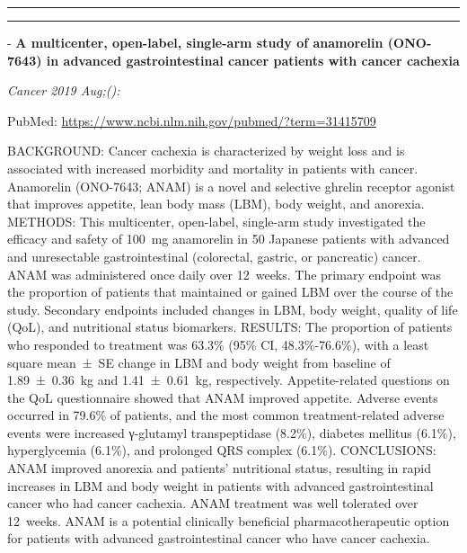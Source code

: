 \documentclass[]{article}
\begin{document}
{}

{}

\begin{center}\rule{0.5\linewidth}{\linethickness}\end{center}

\begin{center}\rule{0.5\linewidth}{\linethickness}\end{center}

 - \textbf{A multicenter, open-label, single-arm study of anamorelin
(ONO-7643) in advanced gastrointestinal cancer patients with cancer
cachexia}

\emph{Cancer 2019 Aug;():}

PubMed: \url{https://www.ncbi.nlm.nih.gov/pubmed/?term=31415709}

BACKGROUND: Cancer cachexia is characterized by weight loss and is
associated with increased morbidity and mortality in patients with
cancer. Anamorelin (ONO-7643; ANAM) is a novel and selective ghrelin
receptor agonist that improves appetite, lean body mass (LBM), body
weight, and anorexia. METHODS: This multicenter, open-label, single-arm
study investigated the efficacy and safety of 100~mg anamorelin in 50
Japanese patients with advanced and unresectable gastrointestinal
(colorectal, gastric, or pancreatic) cancer. ANAM was administered once
daily over 12~weeks. The primary endpoint was the proportion of patients
that maintained or gained LBM over the course of the study. Secondary
endpoints included changes in LBM, body weight, quality of life (QoL),
and nutritional status biomarkers. RESULTS: The proportion of patients
who responded to treatment was 63.3\% (95\% CI, 48.3\%-76.6\%), with a
least square mean~±~SE change in LBM and body weight from baseline of
1.89~±~0.36~kg and 1.41~±~0.61~kg, respectively. Appetite-related
questions on the QoL questionnaire showed that ANAM improved appetite.
Adverse events occurred in 79.6\% of patients, and the most common
treatment-related adverse events were increased γ-glutamyl
transpeptidase (8.2\%), diabetes mellitus (6.1\%), hyperglycemia
(6.1\%), and prolonged QRS complex (6.1\%). CONCLUSIONS: ANAM improved
anorexia and patients' nutritional status, resulting in rapid increases
in LBM and body weight in patients with advanced gastrointestinal cancer
who had cancer cachexia. ANAM treatment was well tolerated over
12~weeks. ANAM is a potential clinically beneficial pharmacotherapeutic
option for patients with advanced gastrointestinal cancer who have
cancer cachexia.
\end{document}
